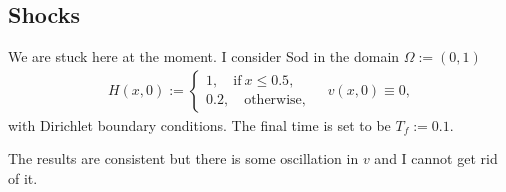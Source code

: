\documentclass[english]{article}
\theoremstyle{thmstyleone}
\theoremstyle{thmstyletwo}
\theoremstyle{thmstylethree}
\begin{document}
\subsection{Shocks}
We are stuck here at the moment. I consider Sod in the domain $\Omega:=(0,1)$
\begin{align}
	H(x,0):=\begin{cases}
		1, \quad \text{if}~x\leq 0.5,\\
		0.2, \quad \text{otherwise},		
	\end{cases} \quad v(x,0)\equiv 0,
\end{align}
with Dirichlet boundary conditions. The final time is set to be $T_f:=0.1.$

The results are consistent but there is some oscillation in $v$ and I cannot get rid of it.







\end{document}
